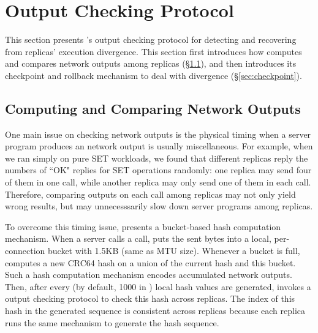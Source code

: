 \section{Output Checking Protocol} \label{sec:output}

This section presents \xxx's output checking protocol for detecting and 
recovering from replicas' execution divergence. This section first introduces 
how \xxx computes and compares network outputs among replicas 
(\S\ref{sec:output-workflow}), and then introduces its checkpoint and rollback 
mechanism to deal with divergence (\S\ref{sec:checkpoint}).

\subsection{Computing and Comparing Network Outputs} \label{sec:output-workflow}

One main issue on checking network outputs is the physical timing when a 
server program produces an network output is usually miscellaneous. For 
example, when we ran \redis simply on pure SET workloads, we found that 
different replicas reply the numbers of ``OK" replies for SET operations 
randomly: one replica may send four of them in one \send call, while another 
replica may only send one of them in each \send call. Therefore, comparing 
outputs on each \send call among replicas may not only yield wrong results, but 
may unnecesssarily slow down server programs among replicas.

To overcome this timing issue, \xxx presents a bucket-based hash computation 
mechanism. When a server calls a \send call, \xxx puts the sent bytes into a 
local, per-connection bucket with 1.5KB (same as MTU size). Whenever a bucket 
is full, \xxx computes a new CRC64 hash on a union of the current hash and this 
bucket. Such a hash computation mechanism encodes accumulated network outputs. 
Then, after every \thashcomp (by default, 1000 in \xxx) local hash values are 
generated, \xxx invokes a output checking protocol to check this hash across 
replicas. The index of this hash in the generated sequence is consistent across 
replicas because each replica runs the same mechanism to generate the hash 
sequence.



